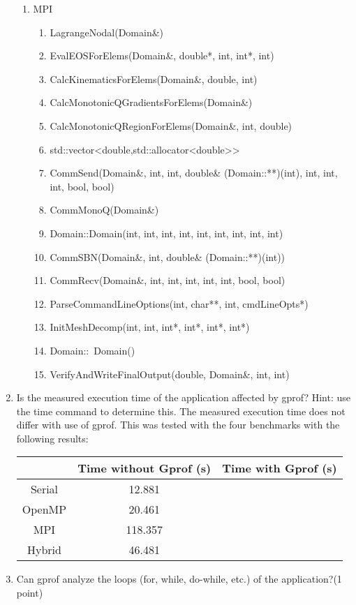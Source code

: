 \documentclass{article}
\begin{document}
\begin{enumerate}
\begin{enumerate}
	\item{MPI}
	\begin{enumerate}
		\item{LagrangeNodal(Domain\&)}
		\item{EvalEOSForElems(Domain\&, double*, int, int*, int)}
		\item{CalcKinematicsForElems(Domain\&, double, int)}
		\item{CalcMonotonicQGradientsForElems(Domain\&)}
		\item{CalcMonotonicQRegionForElems(Domain\&, int, double)}
		\item{std::vector<double,std::allocator<double>>}
		\item{CommSend(Domain\&, int, int, double\& (Domain::**)(int), int, int, int, bool, bool)}
		\item{CommMonoQ(Domain\&)}
		\item{Domain::Domain(int, int, int, int, int, int, int, int, int)}
		\item{CommSBN(Domain\&, int, double\& (Domain::**)(int))}
		\item{CommRecv(Domain\&, int, int, int, int, int, bool, bool)}
		\item{ParseCommandLineOptions(int, char**, int, cmdLineOpts*)}
		\item{InitMeshDecomp(int, int, int*, int*, int*, int*)}
		\item{Domain::~Domain()}
		\item{VerifyAndWriteFinalOutput(double, Domain\&, int, int)}
	\end{enumerate}
\end{enumerate}
\item{Is the measured execution time of the application affected by gprof? Hint: use the time command to determine this.}
The measured execution time does not differ with use of gprof. This was tested with the four benchmarks with the following results:
\begin{center}
\begin{tabular}{|c|c|c|}
\hline
&Time without Gprof (s) & Time with Gprof (s)\\
\hline
Serial &12.881&\\ \hline
OpenMP &20.461&\\ \hline
MPI &118.357&\\ \hline
Hybrid &46.481&\\ \hline
\end{tabular}
\end{center}
\item{Can gprof analyze the loops (for, while, do-while, etc.) of the application?(1 point)}\\

\end{enumerate}
\end{document}
